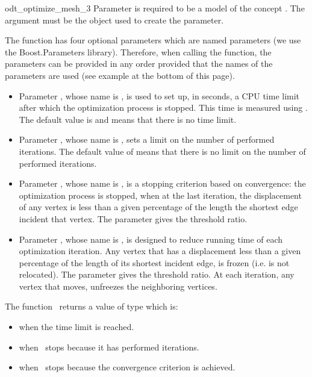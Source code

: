 \begin{ccRefFunction}{odt_optimize_mesh_3}
Parameter  is required to be a model of the concept
. The argument  must be the 
object used to create the  parameter.

The function has four optional parameters which are named parameters
 (we use the Boost.Parameters library). 
Therefore, when calling the function,  the parameters can be provided in any order 
provided that the names of the parameters are used
 (see example at the bottom of this page).
\begin{itemize}
\item
Parameter , whose name is ,
 is used to set up, in seconds,
 a CPU time limit after which the optimization process is stopped. This time is
 measured using .
The default value is  and means that there is no time limit.
\item  Parameter , whose name is 
 , sets a limit on the
number of performed  iterations. The default value of  means that there is 
no limit on the number of performed iterations.
\item  Parameter , whose name is 
 , is a stopping  criterion based on convergence: 
the optimization process is stopped, when at the last iteration,
the displacement of any vertex is less than a given percentage of the length
the shortest edge incident that vertex.
The parameter  gives the threshold ratio.
\item 
Parameter , whose name is ,
is designed to reduce running time of each optimization iteration.
 Any vertex that has
a displacement less than a given percentage of the  length of its shortest incident edge,  is frozen (i.e. is
not relocated). The parameter  gives the threshold ratio. At each iteration, any vertex that
moves, unfreezes the neighboring vertices.
\end{itemize}

The function \ccRefName\ returns a value of type 
which is:
\begin{itemize}
\item {} when the time limit is reached.
\item {} when \ccRefName\ stops because it has performed  iterations.
\item {} when \ccRefName\ stops because the convergence criterion
is achieved.
\end{itemize}




\end{ccRefFunction}
